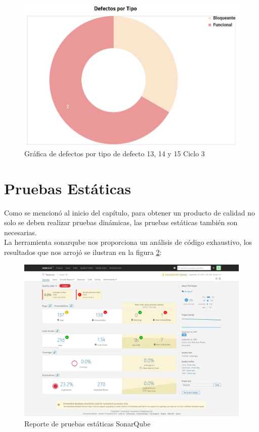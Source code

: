 \begin{figure}[H]
	\begin{center}
		\includegraphics[width=.75\textwidth]{images/pruebas/s13c3-2}
		\caption{Gráfica de defectos por tipo de defecto 13, 14 y 15  Ciclo 3}
		\label{fig:infos13c3-2}
	\end{center}
\end{figure}
\newpage

\section{Pruebas Estáticas}
Como se mencionó al inicio del capítulo, para obtener un producto de calidad no solo se deben realizar pruebas dinámicas, las pruebas estáticas también son necesarias.\\ La herramienta sonarqube nos proporciona un análisis de código exhaustivo, los resultados que nos arrojó se ilustran en la figura \ref{fig:infoesta}: \\

\begin{figure}[H]
	\begin{center}
		\includegraphics[width=.99\textwidth]{images/pruebas/estaticas/TesseractSonarFirstQualityTest}
		\caption{Reporte de pruebas estáticas SonarQube}
		\label{fig:infoesta}
	\end{center}
\end{figure}
